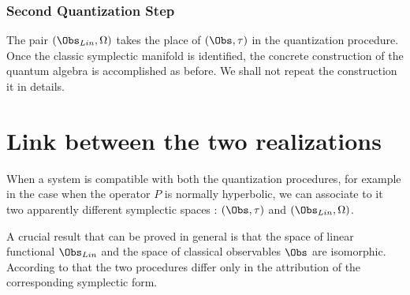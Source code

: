 \documentclass[Main]{subfiles}
\begin{document}
	\subsubsection{Second Quantization Step}
		The pair $(\Obs_{Lin}, \Omega)$ takes the place of $(\Obs, \tau)$ in the quantization procedure.
		Once the classic symplectic manifold is identified, the concrete construction of the quantum algebra is accomplished as before. We shall not repeat the construction it in details.

\section{Link between the two realizations}	\label{Section:LinkBetweenQuantization}
	When a system is compatible with both the quantization procedures, for example in the case when the operator $P$ is normally hyperbolic, we can associate to it two apparently different symplectic spaces : $(\Obs,\tau)$ and $(\Obs_{Lin},\Omega)$.

	A crucial result that can be proved in general is that the space of linear functional $\Obs_{Lin}$ and the space of classical observables $\Obs$ are isomorphic.
	According to that the two procedures differ only in the attribution of the corresponding symplectic form.
\end{document}

